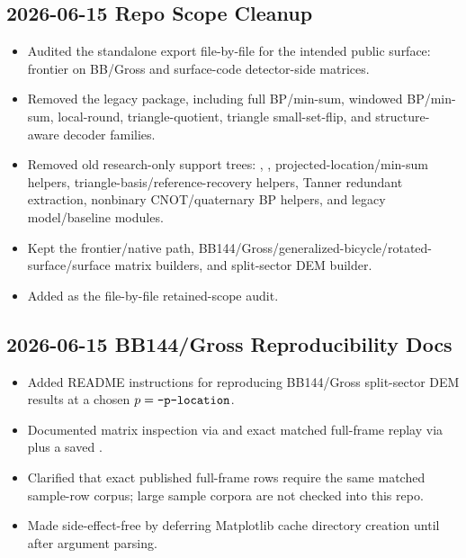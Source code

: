 \subsection*{2026-06-15 Repo Scope Cleanup}

\begin{itemize}
\item Audited the standalone export file-by-file for the intended public surface: frontier on BB/Gross and surface-code detector-side matrices.
\item Removed the legacy \texttt{} package, including full BP/min-sum, windowed BP/min-sum, local-round, triangle-quotient, triangle small-set-flip, and structure-aware decoder families.
\item Removed old research-only support trees: \texttt{}, \texttt{}, projected-location/min-sum helpers, triangle-basis/reference-recovery helpers, Tanner redundant extraction, nonbinary CNOT/quaternary BP helpers, and legacy model/baseline modules.
\item Kept the frontier/native path, BB144/Gross/generalized-bicycle/rotated-surface/surface matrix builders, and split-sector DEM builder.
\item Added \texttt{} as the file-by-file retained-scope audit.
\end{itemize}

\subsection*{2026-06-15 BB144/Gross Reproducibility Docs}

\begin{itemize}
\item Added README instructions for reproducing BB144/Gross split-sector DEM results at a chosen \(p = \texttt{\detokenize{--p-location}}\).
\item Documented matrix inspection via \texttt{} and exact matched full-frame replay via \texttt{} plus a saved \texttt{}.
\item Clarified that exact published full-frame rows require the same matched sample-row corpus; large sample corpora are not checked into this repo.
\item Made \texttt{} side-effect-free by deferring Matplotlib cache directory creation until after argument parsing.
\end{itemize}

